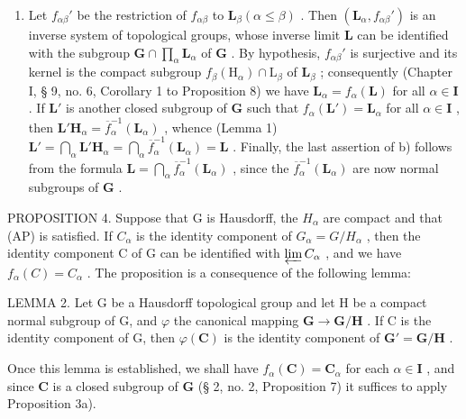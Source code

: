 \begin{enumerate}
\item
  Let \(f_{\alpha \beta}'\) be the restriction of \(f_{\alpha \beta}\) to \(\mathbf{L}_{\beta} (\alpha \leqslant \beta)\) . Then \((\mathbf{L}_{\alpha}, f_{\alpha \beta}')\) is an inverse system of topological groups, whose inverse limit \(\mathbf{L}\) can be identified with the subgroup \(\mathbf{G} \cap \prod_{\alpha} \mathbf{L}_{\alpha}\) of \(\mathbf{G}\) . By hypothesis, \(f_{\alpha \beta}'\) is surjective and its kernel is the compact subgroup \(f_{\beta}(\mathrm{H}_{\alpha}) \cap \mathrm{L}_{\beta}\) of \(\mathbf{L}_{\beta}\) ; consequently (Chapter I, § 9, no. 6, Corollary 1 to Proposition 8) we have \(\mathbf{L}_{\alpha} = f_{\alpha}(\mathbf{L})\) for all \(\alpha \in \mathbf{I}\) . If \(\mathbf{L}'\) is another closed subgroup of \(\mathbf{G}\) such that \(f_{\alpha}(\mathbf{L}') = \mathbf{L}_{\alpha}\) for all \(\alpha \in \mathbf{I}\) , then \(\mathbf{L}'\mathbf{H}_{\alpha} = \overline{f}_{\alpha}^{-1}(\mathbf{L}_{\alpha})\) , whence (Lemma 1) \(\mathbf{L}' = \bigcap_{\alpha} \mathbf{L}'\mathbf{H}_{\alpha} = \bigcap_{\alpha} \overline{f}_{\alpha}^{-1}(\mathbf{L}_{\alpha}) = \mathbf{L}\) . Finally, the last assertion of b) follows from the formula \(\mathbf{L} = \bigcap_{\alpha} \overline{f}_{\alpha}^{-1}(\mathbf{L}_{\alpha})\) , since the \(\overline{f}_{\alpha}^{-1}(\mathbf{L}_{\alpha})\) are now normal subgroups of \(\mathbf{G}\) .
\end{enumerate}

PROPOSITION 4. Suppose that G is Hausdorff, the \(H_{\alpha}\) are compact and that (AP) is satisfied. If \(C_{\alpha}\) is the identity component of \(G_{\alpha} = G/H_{\alpha}\) , then the identity component C of G can be identified with \(\varprojlim C_{\alpha}\) , and we have \(f_{\alpha}(C) = C_{\alpha}\) . The proposition is a consequence of the following lemma:

LEMMA 2. Let G be a Hausdorff topological group and let H be a compact normal subgroup of G, and \(\varphi\) the canonical mapping \(\mathbf{G} \to \mathbf{G} / \mathbf{H}\) . If C is the identity component of G, then \(\varphi(\mathbf{C})\) is the identity component of \(\mathbf{G}' = \mathbf{G} / \mathbf{H}\) .

Once this lemma is established, we shall have \(f_{\alpha}(\mathbf{C}) = \mathbf{C}_{\alpha}\) for each \(\alpha \in \mathbf{I}\) , and since \(\mathbf{C}\) is a closed subgroup of \(\mathbf{G}\) (§ 2, no. 2, Proposition 7) it suffices to apply Proposition 3a).

